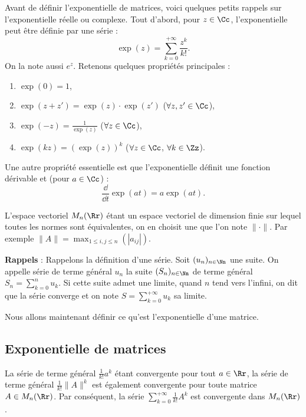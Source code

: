 \documentclass[12pt, class=report,crop=false]{standalone}
\begin{document}
Avant de définir l'exponentielle de matrices, voici quelques petits rappels sur l'exponentielle réelle ou complexe. Tout d'abord, pour $z \in \Cc$, l'exponentielle peut être définie par une série :
\[ \exp(z) = \sum_{k=0}^{+\infty} \frac{{z^k}}{k!}.\]
On la note aussi $e^z$. Retenons quelques propriétés principales :
\begin{enumerate}
  \item $\exp(0) =1$,
  \item $\exp(z+z') = \exp(z) \cdot \exp(z')$ ($\forall z,z' \in \Cc$),
  \item $\exp(-z) = \frac{1}{\exp(z)}$ ($\forall z \in \Cc$),
  \item $\exp(k z) = (\exp(z))^k$ ($\forall z \in \Cc$, $\forall k \in \Zz$).
\end{enumerate}


Une autre propriété essentielle est que l'exponentielle définit une fonction dérivable et (pour $a \in \Cc$) :
$$\frac{\dd}{\dd t} \exp(a t) = a \exp(at).$$




L'espace vectoriel $M_n(\Rr)$ étant un espace vectoriel de 
dimension finie sur lequel toutes les normes sont 
équivalentes, on en choisit une que l'on note $\| \cdot \|$.
Par exemple  $\| A \| = \max_{1\le i,j \le n}( |a_{ij} | )$.

\bigskip

{\bf Rappels} : Rappelons la définition d'une série. Soit 
$(u_n)_{n\in\Nn}$ une suite. On appelle série de terme 
général $u_n$ la suite $(S_n)_{n\in\Nn}$ de terme général 
$\displaystyle S_n=\sum_{k=0}^{n}u_k$. Si cette suite 
admet une limite, quand $n$ tend vers l'infini, on dit que la 
série converge et on note $\displaystyle S=\sum_{k=0}^{+\infty}u_k$ sa limite.


Nous allons maintenant définir ce qu'est l'exponentielle d'une matrice.





\subsection{Exponentielle de matrices}

La série de terme général ${\frac{1}{k!}}a^k$ étant convergente 
pour tout $a\in \Rr$, la série de terme général $\frac{1}{k!}\|A\|^k$ 
est également convergente pour toute matrice $A\in M_n(\Rr)$. 
Par conséquent, la série $\displaystyle \sum_{k=0}^{+\infty} \frac{1}{k!}A^k$ 
est convergente dans $M_n(\Rr)$.
\end{document}
